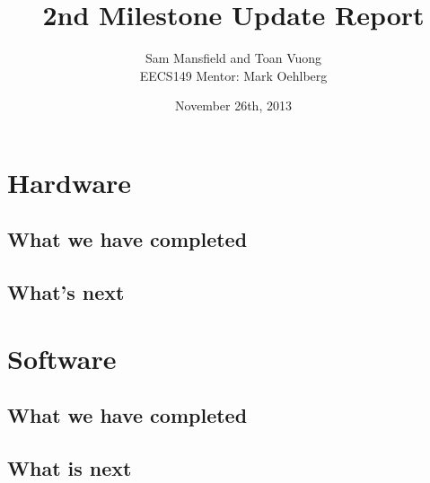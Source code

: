 \documentclass[10pt]{article}
\begin{document}
  \title{2nd Milestone Update Report}
  \author{Sam Mansfield and Toan Vuong\\
          EECS149
          Mentor: Mark Oehlberg}
  \date{November 26th, 2013}
  
  \maketitle

  \section{Hardware}
    \subsection{What we have completed}

    \subsection{What's next}

  \section{Software}
    \subsection{What we have completed}
    
    \subsection{What is next}
\end{document}
